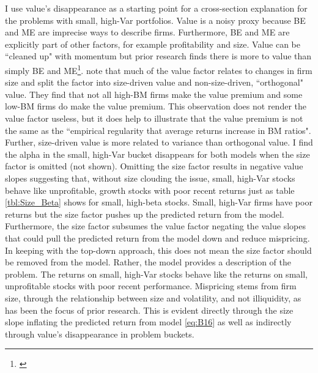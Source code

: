 I use value's disappearance as a starting point for a cross-section
explanation for the problems with small, high-Var portfolios.
Value is a noisy proxy because BE and ME are imprecise ways to describe firms.
Furthermore, BE and ME are explicitly part of other factors, for example
profitability and size.
Value can be ``cleaned up" with momentum but prior research finds there is more
to value than simply BE and ME\footnote{
\textcite{cohen2003value, daniel2006market, fama2008average}}.
\textcite{gerakos2017decomposing} note that much of the value factor relates to
changes in firm size and split the factor into size-driven value and
non-size-driven, ``orthogonal" value.
They find that not all high-BM firms make the value premium and some low-BM
firms do make the value premium.
This observation does not render the value factor useless, but it does help to
illustrate that the value premium is not the same as the ``empirical regularity
that average returns increase in BM ratios".
Further, size-driven value is more related to variance than orthogonal value.
I find the alpha in the small, high-Var bucket disappears for both models
when the size factor is omitted (not shown).
Omitting the size factor results in negative value slopes suggesting that,
without size clouding the issue, small, high-Var stocks behave like
unprofitable, growth stocks with poor recent returns just as table
\ref{tbl:Size_Beta} shows for small, high-beta stocks.
Small, high-Var firms have poor returns but the size factor pushes up
the predicted return from the model.
Furthermore, the size factor subsumes the value factor negating the value
slopes that could pull the predicted return from the model down and
reduce mispricing.
In keeping with the top-down approach, this does not mean the size factor
should be removed from the model.
Rather, the model provides a description of the problem.
The returns on small, high-Var stocks behave like the returns on small,
unprofitable stocks with poor recent performance.
Mispricing stems from firm size, through the relationship between size and
volatility, and not illiquidity, as has been the focus of prior research.
This is evident directly through the size slope inflating the predicted return
from model \ref{eq:B16} as well as indirectly through value's disappearance
in problem buckets.
